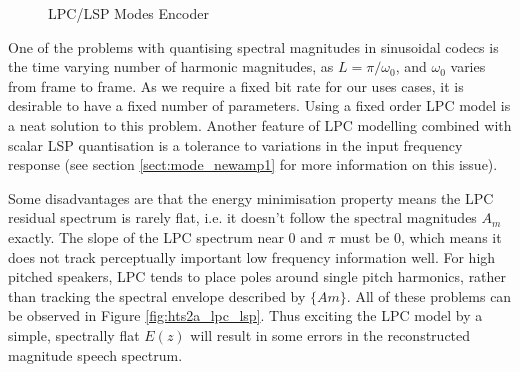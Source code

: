 \documentclass{article}
\begin{document}
\begin{figure}[h]
\caption{LPC/LSP Modes Encoder}
\label{fig:encoder_lpc_lsp}
\begin{center}
\end{center}
\end{figure}

One of the problems with quantising spectral magnitudes in sinusoidal codecs is the time varying number of harmonic magnitudes, as $L=\pi/\omega_0$, and $\omega_0$ varies from frame to frame.  As we require a fixed bit rate for our uses cases, it is desirable to have a fixed number of parameters.  Using a fixed order LPC model is a neat solution to this problem.   Another feature of LPC modelling combined with scalar LSP quantisation is a tolerance to variations in the input frequency response (see section \ref{sect:mode_newamp1} for more information on this issue).

Some disadvantages \cite{makhoul1975linear} are that the energy minimisation property means the LPC residual spectrum is rarely flat, i.e. it doesn't follow the spectral magnitudes $A_m$ exactly.  The slope of the LPC spectrum near 0 and $\pi$ must be 0, which means it does not track perceptually important low frequency information well. For high pitched speakers, LPC tends to place poles around single pitch harmonics, rather than tracking the spectral envelope described by $\{Am\}$. All of these problems can be observed in Figure \ref{fig:hts2a_lpc_lsp}. Thus exciting the LPC model by a simple, spectrally flat $E(z)$ will result in some errors in the reconstructed magnitude speech spectrum.
\end{document}
